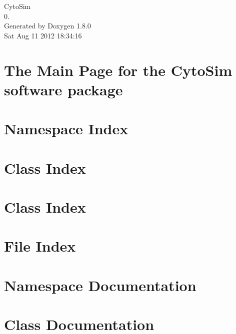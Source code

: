 \documentclass{book}
\begin{document}
\hypersetup{pageanchor=false,citecolor=blue}
\begin{titlepage}
\vspace*{7cm}
\begin{center}
{\Large Cyto\-Sim \\[1ex]\large 0. }\\
\vspace*{1cm}
{\large Generated by Doxygen 1.8.0}\\
\vspace*{0.5cm}
{\small Sat Aug 11 2012 18:34:16}\\
\end{center}
\end{titlepage}
\clearemptydoublepage
{}
\tableofcontents
\clearemptydoublepage
{}
\hypersetup{pageanchor=true,citecolor=blue}
\chapter{The Main Page for the Cyto\-Sim software package}
\label{index}\hypertarget{index}{}
\chapter{Namespace Index}

\chapter{Class Index}

\chapter{Class Index}

\chapter{File Index}

\chapter{Namespace Documentation}

\chapter{Class Documentation}




















\end{document}
